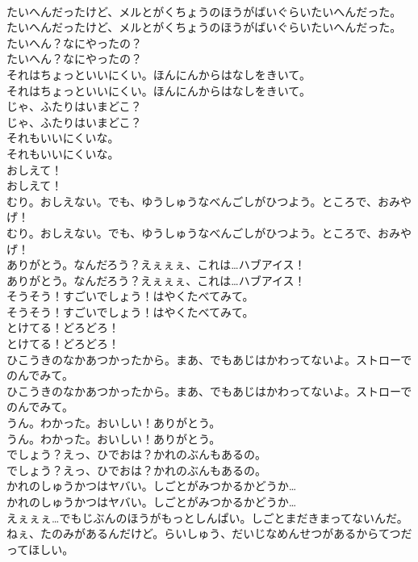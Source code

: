 \documentclass[8pt]{extreport}
\begin{document}
\begin{CJK}{UTF8}{min}
\\	たいへんだったけど、メルとがくちょうのほうがばいぐらいたいへんだった。
\\	たいへんだったけど、メルとがくちょうのほうがばいぐらいたいへんだった。
\\	たいへん？なにやったの？
\\	たいへん？なにやったの？
\\	それはちょっといいにくい。ほんにんからはなしをきいて。
\\	それはちょっといいにくい。ほんにんからはなしをきいて。
\\	じゃ、ふたりはいまどこ？
\\	じゃ、ふたりはいまどこ？
\\	それもいいにくいな。
\\	それもいいにくいな。
\\	おしえて！
\\	おしえて！
\\	むり。おしえない。でも、ゆうしゅうなべんごしがひつよう。ところで、おみやげ！
\\	むり。おしえない。でも、ゆうしゅうなべんごしがひつよう。ところで、おみやげ！
\\	ありがとう。なんだろう？えぇぇぇ、これは…ハブアイス！
\\	ありがとう。なんだろう？えぇぇぇ、これは…ハブアイス！
\\	そうそう！すごいでしょう！はやくたべてみて。
\\	そうそう！すごいでしょう！はやくたべてみて。
\\	とけてる！どろどろ！
\\	とけてる！どろどろ！
\\	ひこうきのなかあつかったから。まあ、でもあじはかわってないよ。ストローでのんでみて。
\\	ひこうきのなかあつかったから。まあ、でもあじはかわってないよ。ストローでのんでみて。
\\	うん。わかった。おいしい！ありがとう。
\\	うん。わかった。おいしい！ありがとう。
\\	でしょう？えっ、ひでおは？かれのぶんもあるの。
\\	でしょう？えっ、ひでおは？かれのぶんもあるの。
\\	かれのしゅうかつはヤバい。しごとがみつかるかどうか…
\\	かれのしゅうかつはヤバい。しごとがみつかるかどうか…
\\	えぇぇぇ…でもじぶんのほうがもっとしんぱい。しごとまだきまってないんだ。ねぇ、たのみがあるんだけど。らいしゅう、だいじなめんせつがあるからてつだってほしい。

\end{CJK}
\end{document}
